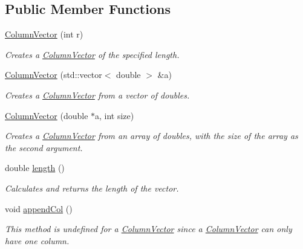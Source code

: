 \subsection*{Public Member Functions}
\begin{DoxyCompactItemize}
\item 
\hyperlink{class_column_vector_a080508988b684290b2a0123a923a1e08}{ColumnVector} (int r)
\begin{DoxyCompactList}\small\item\em Creates a \hyperlink{class_column_vector}{ColumnVector} of the specified length. \item\end{DoxyCompactList}\item 
\hyperlink{class_column_vector_a51a68a454f01918fd4bc1736ac0d4264}{ColumnVector} (std::vector$<$ double $>$ \&a)
\begin{DoxyCompactList}\small\item\em Creates a \hyperlink{class_column_vector}{ColumnVector} from a vector of doubles. \item\end{DoxyCompactList}\item 
\hyperlink{class_column_vector_aa0b9560305d34dd819e7913a811f3336}{ColumnVector} (double $\ast$a, int size)
\begin{DoxyCompactList}\small\item\em Creates a \hyperlink{class_column_vector}{ColumnVector} from an array of doubles, with the size of the array as the second argument. \item\end{DoxyCompactList}\item 
double \hyperlink{class_column_vector_a66329a870ee70b5cd93879d3be247b21}{length} ()
\begin{DoxyCompactList}\small\item\em Calculates and returns the length of the vector. \item\end{DoxyCompactList}\item 
void \hyperlink{class_column_vector_a0e67b7831d9d4c02691056a72abc6975}{appendCol} ()
\begin{DoxyCompactList}\small\item\em This method is undefined for a \hyperlink{class_column_vector}{ColumnVector} since a \hyperlink{class_column_vector}{ColumnVector} can only have one column. \item\end{DoxyCompactList}\end{DoxyCompactItemize}


